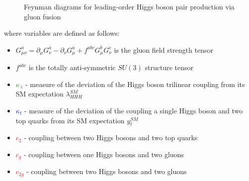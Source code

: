 \begin{figure}[!htbp]
  \caption{Feynman diagrams for leading-order Higgs boson pair production via gluon fusion}
  \label{fig:ggHH_production}
  \end{figure}
  

where variables are defined as follows:

\begin{itemize} \label{EFT_parameters_description}
  \item $G^a_{\mu \nu} = \partial_{\mu} G_{\nu}^a - \partial_{\nu} G_{\mu}^a + f^{abc}  G_{\mu}^b G_{\nu}^c$ is the gluon field strength tensor
  \item $f^{abc}$ is the totally anti-symmetric $SU(3)$ structure tensor
  \item \textcolor{ForestGreen}{$\kappa_{\lambda}$} - measure of the deviation of the Higgs boson trilinear coupling from its SM expectation $\lambda_{HHH}^{SM}$
  \item \textcolor{blue}{$\kappa_{t}$} - measure of the deviation of the coupling a single Higgs boson and two top quarks from its SM expectation $y_{t}^{SM}$
  \item \textcolor{red}{$c_{2}$} - coupling between two Higgs bosons and two top quarks
  \item \textcolor{red}{$c_{g}$} - coupling between one Higgs bosons and two gluons
  \item \textcolor{red}{$c_{2g}$} - coupling between two Higgs bosons and two gluons
\end{itemize}

